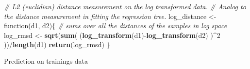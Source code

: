 \documentclass[]{article}
\newenvironment{Shaded}{\begin{snugshade}}{\end{snugshade}}
\newcommand{\KeywordTok}[1]{\textcolor[rgb]{0.13,0.29,0.53}{\textbf{{#1}}}}
\newcommand{\DecValTok}[1]{\textcolor[rgb]{0.00,0.00,0.81}{{#1}}}
\newcommand{\StringTok}[1]{\textcolor[rgb]{0.31,0.60,0.02}{{#1}}}
\newcommand{\CommentTok}[1]{\textcolor[rgb]{0.56,0.35,0.01}{\textit{{#1}}}}
\newcommand{\NormalTok}[1]{{#1}}
\begin{document}
\begin{Shaded}
\begin{Highlighting}[]
\CommentTok{# L2 (euclidian) distance measurement on the log transformed data. }
\CommentTok{# Analog to the distance measurement in fitting the regression tree.}
\NormalTok{log_distance <-}\StringTok{ }\NormalTok{function(d1, d2)\{}
  \CommentTok{# sums over all the distances of the samples in log space}
  \NormalTok{log_rmsd <-}\StringTok{ }\KeywordTok{sqrt}\NormalTok{(}\KeywordTok{sum}\NormalTok{( (}\KeywordTok{log_transform}\NormalTok{(d1)-}\KeywordTok{log_transform}\NormalTok{(d2) )^}\DecValTok{2} \NormalTok{))/}\KeywordTok{length}\NormalTok{(d1)}
  \KeywordTok{return}\NormalTok{(log_rmsd)}
\NormalTok{\}}
\end{Highlighting}
\end{Shaded}

Prediction on trainings data
\end{document}
